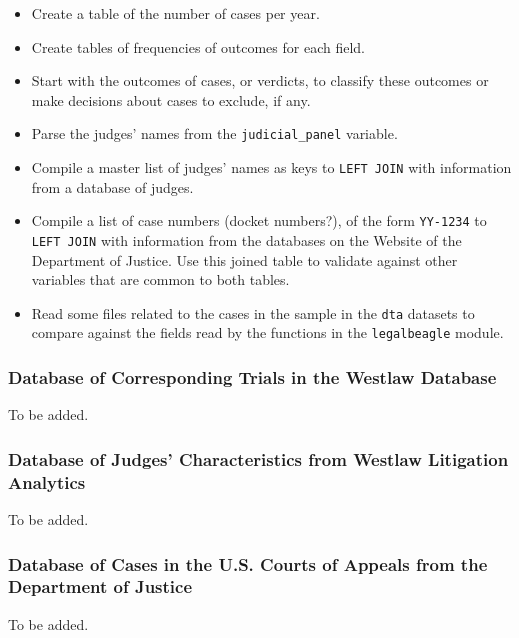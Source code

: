 \documentclass[11pt]{paper}
\begin{document}
\begin{itemize}

	\item Create a table of the number of cases per year. 

	\item Create tables of frequencies of outcomes for each field. 

	\item Start with the outcomes of cases, or verdicts, 
		to classify these outcomes or make decisions about cases to exclude, if any. 

	\item Parse the judges' names from the \texttt{judicial\_panel} variable. 

	\item Compile a master list of judges' names as keys 
		to \texttt{LEFT JOIN} with information from a database of judges. 
 
	\item Compile a list of case numbers (docket numbers?), 
		of the form \texttt{YY-1234}
		to \texttt{LEFT JOIN} with information from the databases 
		on the Website of the Department of Justice. 
		Use this joined table to validate against other variables that are 
		common to both tables. 

	\item Read some files related to the cases in the sample 
		in the \texttt{dta} datasets to compare against the fields
		read by the functions in the \texttt{legalbeagle} module.

\end{itemize}


\subsubsection*{Database of Corresponding Trials 
	in the Westlaw Database}

To be added. 

\subsubsection*{Database of Judges' Characteristics 
	from Westlaw Litigation Analytics}

To be added. 

\subsubsection*{Database of Cases in the U.S. Courts of Appeals 
	from the Department of Justice}

To be added. 
\end{document}
